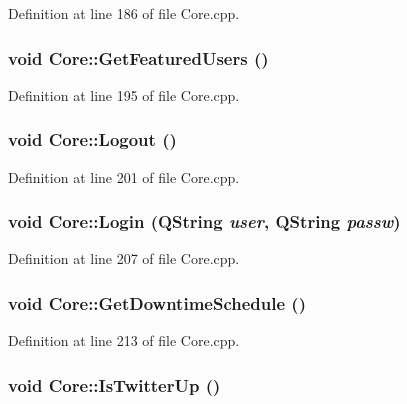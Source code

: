 Definition at line 186 of file Core.cpp.\hypertarget{classCore_c5f77029d34a1427c6b8a491c646e80b}{
\subsubsection{\setlength{\rightskip}{0pt plus 5cm}void Core::GetFeaturedUsers ()}}
\label{classCore_c5f77029d34a1427c6b8a491c646e80b}




Definition at line 195 of file Core.cpp.\hypertarget{classCore_e4ec033e04b6490ac08d6f07507bc9c2}{
\subsubsection{\setlength{\rightskip}{0pt plus 5cm}void Core::Logout ()}}
\label{classCore_e4ec033e04b6490ac08d6f07507bc9c2}




Definition at line 201 of file Core.cpp.\hypertarget{classCore_4570f9ad07c0ba58ce6326eb76568bf6}{
\subsubsection{\setlength{\rightskip}{0pt plus 5cm}void Core::Login (QString {\em user}, \/  QString {\em passw})}}
\label{classCore_4570f9ad07c0ba58ce6326eb76568bf6}




Definition at line 207 of file Core.cpp.\hypertarget{classCore_7ba2a526280dcfc427480956f90f29cb}{
\subsubsection{\setlength{\rightskip}{0pt plus 5cm}void Core::GetDowntimeSchedule ()}}
\label{classCore_7ba2a526280dcfc427480956f90f29cb}




Definition at line 213 of file Core.cpp.\hypertarget{classCore_eeaa4a9429ac0a0dd2c2d11c0c0eea81}{
\subsubsection{\setlength{\rightskip}{0pt plus 5cm}void Core::IsTwitterUp ()}}
\label{classCore_eeaa4a9429ac0a0dd2c2d11c0c0eea81}




